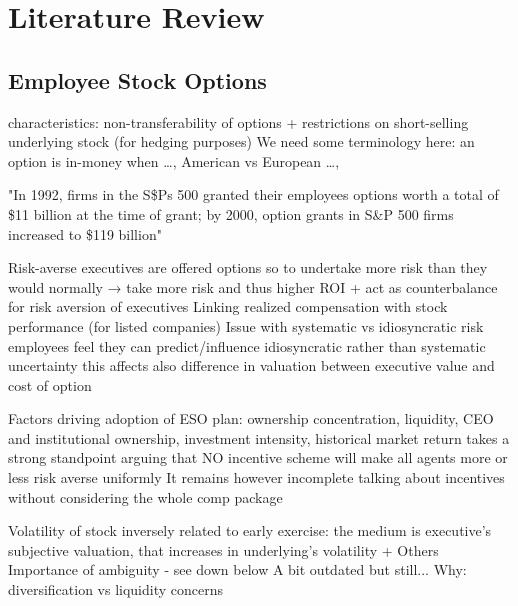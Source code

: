 \section{Literature Review}

\subsection{Employee Stock Options} %

    characteristics: non-transferability of options + restrictions on short-selling underlying stock (for hedging purposes)
    We need some terminology here: an option is in-money when \dots, American vs European \dots, 

    "In 1992, firms in the S\$Ps 500 granted their employees options worth a total of \$11 billion at the time of grant; by 2000, option grants in S\&P 500 firms increased to \$119 billion" \cite{hall2003trouble}

    Risk-averse executives are offered options so to undertake more risk than they would normally → take more risk and thus higher ROI + act as counterbalance for risk aversion of executives
    Linking realized compensation with stock performance (for listed companies)
    Issue with systematic vs idiosyncratic risk  \cite{armstrong2012executive} \cite{heron2017stock}
        employees feel they can predict/influence idiosyncratic rather than systematic uncertainty
        this affects also difference in valuation between executive value and cost of option \cite{meulbroek2001efficiency}

    Factors driving adoption of ESO plan: ownership concentration, liquidity, CEO and institutional ownership, investment intensity, historical market return \cite{pasternack2002factors}
    \cite{ross2004compensation} takes a strong standpoint arguing that NO incentive scheme will make all agents more or less risk averse uniformly
    It remains however incomplete talking about incentives without considering the whole comp package

    Volatility of stock inversely related to early exercise: the medium is executive's subjective valuation, that increases in underlying's volatility \cite{heron2017stock} \cite{izhakian2017risk} + Others
    Importance of ambiguity - see down below 
    A bit outdated but still... \cite{huddart1996employee}
    Why: diversification vs liquidity concerns \cite{murphy2019employees}


